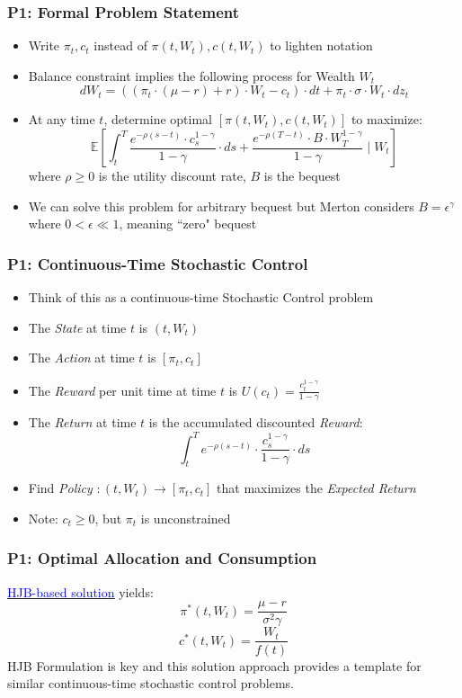 \documentclass[handout]{beamer}
\begin{document}
\begin{frame}
\frametitle{P1: Formal Problem Statement}
\pause
\begin{itemize}[<+->]
\item Write $\pi_t, c_t$ instead of $\pi(t, W_t), c(t, W_t)$ to lighten notation
\item Balance constraint implies the following process for Wealth $W_t$
$$dW_t = ((\pi_t \cdot (\mu - r) + r) \cdot W_t - c_t) \cdot dt + \pi_t \cdot \sigma \cdot W_t \cdot dz_t$$
\item At any time $t$, determine optimal $[\pi(t,W_t), c(t, W_t)]$ to maximize:
$$\mathbb{E}[\int_t^T \frac {e^{-\rho (s-t)} \cdot c_s^{1-\gamma}} {1-\gamma} \cdot ds + \frac {e^{-\rho (T-t)} \cdot B \cdot W_T^{1-\gamma}} {1-\gamma} \mid W_t]$$
where $\rho \geq 0$ is the utility discount rate, $B$ is the bequest
\item We can solve this problem for arbitrary bequest but Merton considers $B = \epsilon^{\gamma}$
where $0 < \epsilon \ll 1$, meaning ``zero" bequest
\end{itemize}
\end{frame}

\begin{frame}
\frametitle{P1: Continuous-Time Stochastic Control}
\begin{itemize}[<+->]
\item Think of this as a continuous-time Stochastic Control problem
\item The {\em State} at time $t$ is $(t, W_t)$
\item The {\em Action} at time $t$ is $[\pi_t, c_t]$
\item The {\em Reward} per unit time at time $t$ is $U(c_t) = \frac {c_t^{1 - \gamma}} {1 - \gamma}$ 
\item The {\em Return} at time $t$ is the accumulated discounted {\em Reward}:
$$\int_t^T e^{-\rho(s-t)} \cdot \frac {c_s^{1-\gamma}} {1-\gamma} \cdot ds$$
\item Find {\em Policy} $: (t, W_t) \rightarrow [\pi_t, c_t]$ that maximizes the {\em Expected Return}
\item Note: $c_t \geq 0$, but $\pi_t$ is unconstrained
\end{itemize}
\end{frame}

\begin{frame}
\frametitle{P1: Optimal Allocation and Consumption}
\pause
\href{https://github.com/coverdrive/technical-documents/blob/master/finance/cme241/Tour-AssetAlloc.pdf}{\underline{\textcolor{blue}{HJB-based solution}}} yields:
$$\pi^*(t, W_t) = \frac {\mu - r} {\sigma^2 \gamma}$$
\pause
$$
c^*(t, W_t)= \frac {W_t} {f(t)}$$
\pause
HJB Formulation is key and this solution approach provides a template for similar continuous-time stochastic control problems.
\end{frame}
\end{document}
